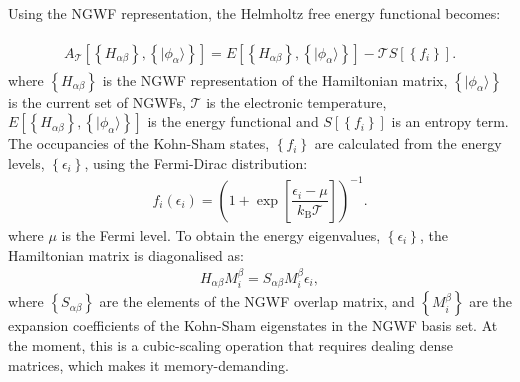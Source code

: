 \documentclass[letterpaper,10pt,english]{sphinxmanual}
\begin{document}
Using the NGWF representation, the Helmholtz free energy functional
becomes:

\label{\detokenize{onetep_edft_documentation:equation-freeenergy2}}\begin{equation}\label{equation:onetep_edft_documentation:freeenergy2}
\begin{split}\begin{aligned}
A_{\mathcal{T}}\left[{\left\lbrace H_{\alpha\beta} \right\rbrace},{\left\lbrace \lvert\phi_\alpha\rangle \right\rbrace}\right]
= E\left[{\left\lbrace H_{\alpha\beta} \right\rbrace},{\left\lbrace \lvert\phi_\alpha\rangle \right\rbrace}\right] -
{\mathcal{T}}S\left[{\left\lbrace f_i \right\rbrace}\right].\end{aligned}\end{split}
\end{equation}
where \({\left\lbrace H_{\alpha\beta} \right\rbrace}\) is the NGWF
representation of the Hamiltonian matrix,
\({\left\lbrace \lvert\phi_\alpha\rangle \right\rbrace}\) is the current
set of NGWFs, \({\mathcal{T}}\) is the electronic temperature,
\(E\left[{\left\lbrace H_{\alpha\beta} \right\rbrace},{\left\lbrace \lvert\phi_\alpha\rangle \right\rbrace}\right]\)
is the energy functional and
\(S\left[{\left\lbrace f_i \right\rbrace}\right]\) is an entropy
term. The occupancies of the Kohn-Sham states,
\({\left\lbrace f_i \right\rbrace}\) are calculated from the energy
levels, \({\left\lbrace \epsilon_i \right\rbrace}\), using the
Fermi-Dirac distribution:
\begin{equation*}
\begin{split}\label{eq:fermidirac}
 f_i\left(\epsilon_i\right) = \left( 1 + \exp\left[\dfrac{\epsilon_i -
 \mu}{{k_\textrm{B}}{\mathcal{T}}}\right] \right)^{-1}.\end{split}
\end{equation*}
where \(\mu\) is the Fermi level. To obtain the energy eigenvalues,
\({\left\lbrace \epsilon_i \right\rbrace}\), the Hamiltonian matrix
is diagonalised as:
\begin{equation*}
\begin{split}\label{eq:hamdiag}
 H_{\alpha\beta} {M^\beta_i} = S_{\alpha\beta} {M^\beta_i} \epsilon_i,\end{split}
\end{equation*}
where \({\left\lbrace S_{\alpha\beta} \right\rbrace}\) are the
elements of the NGWF overlap matrix, and
\({\left\lbrace {M^\beta_i} \right\rbrace}\) are the
expansion coefficients of the Kohn-Sham eigenstates in the NGWF basis
set. At the moment, this is a cubic-scaling operation that requires
dealing dense matrices, which makes it memory-demanding.
\end{document}
